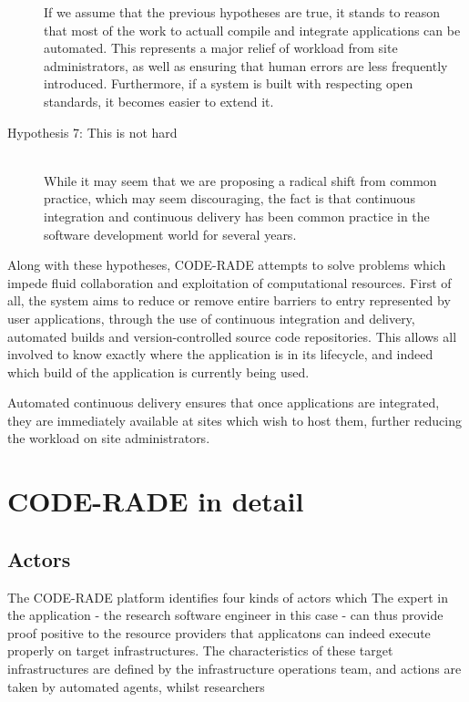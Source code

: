 \documentclass[a4paper]{jpconf}
\begin{document}
\begin{description}
    If we assume that the previous hypotheses are true, it stands to reason that most of the work to actuall compile and integrate applications can be automated. This represents a major relief of workload from site administrators, as well as ensuring that human errors are less frequently introduced. Furthermore, if a system is built with respecting open standards, it becomes easier to extend it.
  \item[Hypothesis 7: This is not hard] \hfill \\
    While it may seem that we are proposing a radical shift from common practice, which may seem discouraging, the fact is that continuous integration\cite{ContinuousIntegration} and continuous delivery\cite{ContinuousDelivery} has been common practice in the software development world for several years.
\end{description}

Along with these hypotheses, CODE-RADE attempts  to solve problems which impede fluid collaboration and exploitation of computational resources. First of all, the system aims to reduce or remove entire barriers to entry represented by user applications, through the use of continuous integration and delivery, automated builds and version-controlled source code repositories. This allows all involved to know exactly where the application is in its lifecycle, and indeed which build of the application is currently being used.

Automated continuous delivery ensures that once applications are integrated, they are immediately available at sites which wish to host them, further reducing the workload on site administrators.

\section{CODE-RADE in detail}

\subsection{Actors}

The CODE-RADE platform identifies four kinds of actors which
The expert in the application - the research software engineer in this case - can thus provide proof positive to the resource providers that applicatons can indeed execute properly on target infrastructures. The characteristics of these target infrastructures are defined by the infrastructure operations team, and actions are taken by automated agents, whilst researchers
\end{document}

